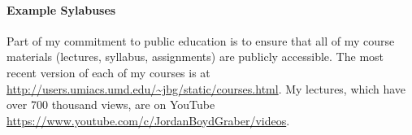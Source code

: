 \documentclass[11pt, amssymb, a4paper, one column]{article}
\begin{document}
\paragraph{Example Sylabuses}

Part of my commitment to public education is to ensure that all of my course
materials (lectures, syllabus, assignments) are publicly accessible. The most
recent version of each of my courses is at
\url{http://users.umiacs.umd.edu/~jbg/static/courses.html}.  My
lectures, which have over 700 thousand views, are
on YouTube \url{https://www.youtube.com/c/JordanBoydGraber/videos}.
\end{document}
